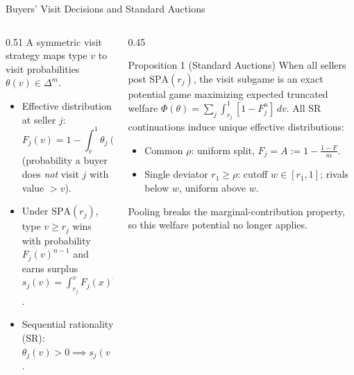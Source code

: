 \documentclass[11pt,aspectratio=169]{beamer}
\def\meditem{\smallskip\item}
\newcommand{\SPA}{\mathrm{SPA}}
\begin{document}
\begin{frame}{Buyers' Visit Decisions and Standard Auctions}
\begin{columns}[T]
\begin{column}{0.51\textwidth}
A symmetric visit strategy maps type $v$ to visit probabilities $\theta(v)\in\Delta^m$.
\begin{itemize}
\item \alert{Effective distribution} at seller $j$:
\[
F_j(v) = 1 - \int_v^1 \theta_j(x)f(x)\,dx
\]
(probability a buyer does \emph{not} visit $j$ with value $>v$).
\meditem Under $\SPA(r_j)$, type $v\ge r_j$ wins with probability $F_j(v)^{n-1}$ and earns surplus $s_j(v)=\int_{r_j}^v F_j(x)^{n-1}\,dx$.
\meditem \alert{Sequential rationality} (SR): $\theta_j(v)>0 \implies s_j(v)=\max_k s_k(v)$.
\end{itemize}
\end{column}
\begin{column}{0.45\textwidth}
\begin{block}{Proposition 1 (Standard Auctions)}
When all sellers post $\SPA(r_j)$, the visit subgame is an exact potential game maximizing expected truncated welfare $\Phi(\theta)=\sum_j\int_{r_j}^1[1-F_j^n]\,dv$. All SR continuations induce unique effective distributions:
\begin{itemize}
\item Common $\rho$: uniform split, $F_j=A:=1-\frac{1-F}{m}$.
\item Single deviator $r_1\ge\rho$: cutoff $w\in[r_1,1]$; rivals below $w$, uniform above $w$.
\end{itemize}
\end{block}
{\footnotesize Pooling breaks the marginal-contribution property, so this welfare potential no longer applies.}
\end{column}
\end{columns}
\end{frame}
\end{document}
